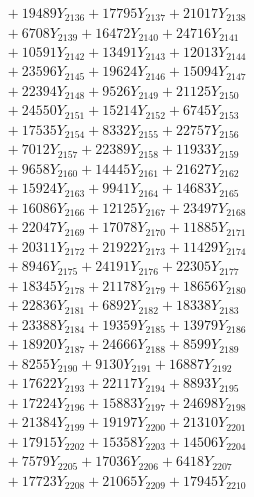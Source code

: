 \documentclass[a4paper,10pt]{article}
\begin{document}
{\begin{align}
&\;  + 19489 Y_{2136} + 17795 Y_{2137} + 21017 Y_{2138} \\[0.3ex]
&\;  + 6708 Y_{2139} + 16472 Y_{2140} + 24716 Y_{2141} \\[0.3ex]
&\;  + 10591 Y_{2142} + 13491 Y_{2143} + 12013 Y_{2144} \\[0.3ex]
&\;  + 23596 Y_{2145} + 19624 Y_{2146} + 15094 Y_{2147} \\[0.3ex]
&\;  + 22394 Y_{2148} + 9526 Y_{2149} + 21125 Y_{2150} \\[0.3ex]
&\;  + 24550 Y_{2151} + 15214 Y_{2152} + 6745 Y_{2153} \\[0.3ex]
&\;  + 17535 Y_{2154} + 8332 Y_{2155} + 22757 Y_{2156} \\[0.3ex]
&\;  + 7012 Y_{2157} + 22389 Y_{2158} + 11933 Y_{2159} \\[0.5ex]\allowbreak
&\;  + 9658 Y_{2160} + 14445 Y_{2161} + 21627 Y_{2162} \\[0.3ex]
&\;  + 15924 Y_{2163} + 9941 Y_{2164} + 14683 Y_{2165} \\[0.3ex]
&\;  + 16086 Y_{2166} + 12125 Y_{2167} + 23497 Y_{2168} \\[0.3ex]
&\;  + 22047 Y_{2169} + 17078 Y_{2170} + 11885 Y_{2171} \\[0.3ex]
&\;  + 20311 Y_{2172} + 21922 Y_{2173} + 11429 Y_{2174} \\[0.3ex]
&\;  + 8946 Y_{2175} + 24191 Y_{2176} + 22305 Y_{2177} \\[0.3ex]
&\;  + 18345 Y_{2178} + 21178 Y_{2179} + 18656 Y_{2180} \\[0.3ex]
&\;  + 22836 Y_{2181} + 6892 Y_{2182} + 18338 Y_{2183} \\[0.3ex]
&\;  + 23388 Y_{2184} + 19359 Y_{2185} + 13979 Y_{2186} \\[0.3ex]
&\;  + 18920 Y_{2187} + 24666 Y_{2188} + 8599 Y_{2189} \\[0.5ex]\allowbreak
&\;  + 8255 Y_{2190} + 9130 Y_{2191} + 16887 Y_{2192} \\[0.3ex]
&\;  + 17622 Y_{2193} + 22117 Y_{2194} + 8893 Y_{2195} \\[0.3ex]
&\;  + 17224 Y_{2196} + 15883 Y_{2197} + 24698 Y_{2198} \\[0.3ex]
&\;  + 21384 Y_{2199} + 19197 Y_{2200} + 21310 Y_{2201} \\[0.3ex]
&\;  + 17915 Y_{2202} + 15358 Y_{2203} + 14506 Y_{2204} \\[0.3ex]
&\;  + 7579 Y_{2205} + 17036 Y_{2206} + 6418 Y_{2207} \\[0.3ex]
&\;  + 17723 Y_{2208} + 21065 Y_{2209} + 17945 Y_{2210} \\[0.3ex]

\end{align}}
\end{document}

